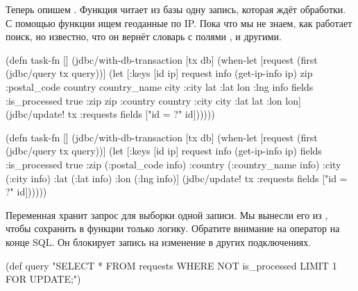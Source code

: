Теперь опишем . Функция читает из базы одну запись, которая
ждёт обработки. С помощью функции  ищем геоданные по
IP. Пока что мы не знаем, как работает поиск, но известно, что он вернёт словарь
с полями ,  и другими.


\ifnarrow

\begin{clojure/lines}
(defn task-fn []
 (jdbc/with-db-transaction [tx db]
  (when-let [request
             (first
              (jdbc/query tx query))]
    (let [{:keys [id ip]} request
          info   (get-ip-info ip)
          {zip :postal_code
           country country_name
           city :city lat :lat
           lon :lng} info
          fields {:is_processed true
                  :zip zip
                  :country country
                  :city city
                  :lat lat
                  :lon lon}]
      (jdbc/update! tx :requests
        fields ["id = ?" id])))))
\end{clojure/lines}

\else

\begin{clojure/lines}
(defn task-fn []
  (jdbc/with-db-transaction [tx db]
    (when-let [request (first (jdbc/query tx query))]
      (let [{:keys [id ip]} request
            info   (get-ip-info ip)
            fields {:is_processed true
                    :zip (:postal_code info)
                    :country (:country_name info)
                    :city (:city info)
                    :lat (:lat info)
                    :lon (:lng info)}]
        (jdbc/update! tx :requests
                      fields
                      ["id = ?" id])))))
\end{clojure/lines}

\fi


Переменная  хранит запрос для выборки одной записи. Мы вынесли его
из , чтобы сохранить в функции только логику. Обратите внимание на
оператор  на конце SQL. Он блокирует запись на изменение в
других подключениях.

\ifnarrow

\begin{clojure}
(def query
  "SELECT * FROM requests
   WHERE NOT is_processed
   LIMIT 1 FOR UPDATE;")
\end{clojure}

\else

